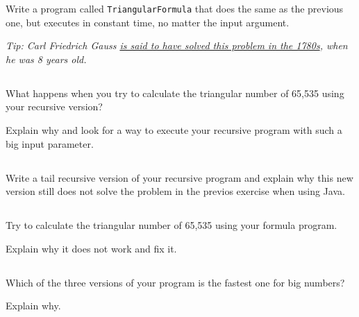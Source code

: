 \documentclass[a4paper, 11pt]{article}
\begin{document}
Write a program called \texttt{TriangularFormula} that does the same as the
previous one, but executes in constant time, no matter the input argument.

\textsl{Tip: Carl Friedrich Gauss
\href{http://www.americanscientist.org/issues/pub/gausss-day-of-reckoning/1}{is
said to have solved this problem in the 1780s}, when he was 8 years old.}


\subsection{}

What happens when you try to calculate the triangular number of 65,535 using
your recursive version?

Explain why and look for a way to execute your recursive program with such a
big input parameter.

\subsection{}

Write a tail recursive version of your recursive program and explain why this
new version still does not solve the problem in the previos exercise when using
Java.


\subsection{}

Try to calculate the triangular number of 65,535 using your formula program.

Explain why it does not work and fix it.


\subsection{}

Which of the three versions of your program is the fastest one for big numbers?

Explain why.
\end{document}
